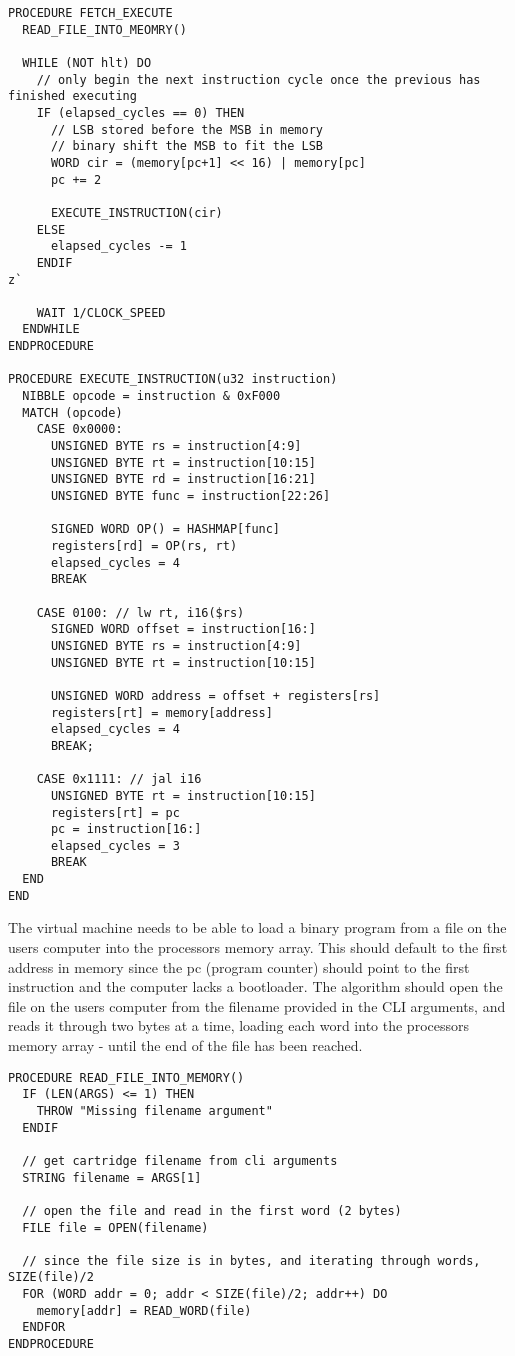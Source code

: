 \begin{lstlisting}
PROCEDURE FETCH_EXECUTE 
  READ_FILE_INTO_MEOMRY()

  WHILE (NOT hlt) DO 
    // only begin the next instruction cycle once the previous has finished executing
    IF (elapsed_cycles == 0) THEN 
      // LSB stored before the MSB in memory
      // binary shift the MSB to fit the LSB
      WORD cir = (memory[pc+1] << 16) | memory[pc]
      pc += 2

      EXECUTE_INSTRUCTION(cir)
    ELSE 
      elapsed_cycles -= 1
    ENDIF
z`

    WAIT 1/CLOCK_SPEED
  ENDWHILE
ENDPROCEDURE

PROCEDURE EXECUTE_INSTRUCTION(u32 instruction)
  NIBBLE opcode = instruction & 0xF000 
  MATCH (opcode) 
    CASE 0x0000: 
      UNSIGNED BYTE rs = instruction[4:9]
      UNSIGNED BYTE rt = instruction[10:15]
      UNSIGNED BYTE rd = instruction[16:21]
      UNSIGNED BYTE func = instruction[22:26]

      SIGNED WORD OP() = HASHMAP[func] 
      registers[rd] = OP(rs, rt)
      elapsed_cycles = 4
      BREAK

    CASE 0100: // lw rt, i16($rs)
      SIGNED WORD offset = instruction[16:]
      UNSIGNED BYTE rs = instruction[4:9]
      UNSIGNED BYTE rt = instruction[10:15]

      UNSIGNED WORD address = offset + registers[rs]
      registers[rt] = memory[address]
      elapsed_cycles = 4
      BREAK;

    CASE 0x1111: // jal i16
      UNSIGNED BYTE rt = instruction[10:15]
      registers[rt] = pc
      pc = instruction[16:]
      elapsed_cycles = 3
      BREAK
  END
END
\end{lstlisting}

The virtual machine needs to be able to load a binary program from a file on the users computer into the processors memory array. This should default to the first address in memory since the pc (program counter) should point to the first instruction and the computer lacks a bootloader. The algorithm should open the file on the users computer from the filename provided in the CLI arguments, and reads it through two bytes at a time, loading each word into the processors memory array - until the end of the file has been reached.

\begin{lstlisting}
PROCEDURE READ_FILE_INTO_MEMORY() 
  IF (LEN(ARGS) <= 1) THEN 
    THROW "Missing filename argument"
  ENDIF 

  // get cartridge filename from cli arguments
  STRING filename = ARGS[1] 

  // open the file and read in the first word (2 bytes)
  FILE file = OPEN(filename)

  // since the file size is in bytes, and iterating through words, SIZE(file)/2
  FOR (WORD addr = 0; addr < SIZE(file)/2; addr++) DO
    memory[addr] = READ_WORD(file)
  ENDFOR
ENDPROCEDURE
\end{lstlisting}


